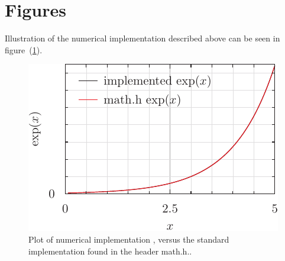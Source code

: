 \documentclass[twocolumn]{article}
\begin{document}
    \section{Figures}
    Illustration of the numerical implementation described above can be seen in figure~(\ref{fig:pyxplot}).


    \begin{figure}[h]
        \includegraphics{exponentialPlot.pdf}
        \caption{ Plot of numerical implementation , versus the standard implementation found in the header math.h..}
        \label{fig:pyxplot}
    \end{figure}
\end{document}
